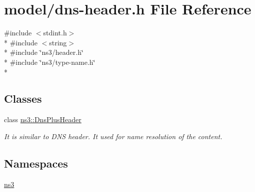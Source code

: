 \hypertarget{dns-header_8h}{\section{model/dns-\/header.h File Reference}
\label{dns-header_8h}
}
{\ttfamily \#include $<$stdint.\-h$>$}\\*
{\ttfamily \#include $<$string$>$}\\*
{\ttfamily \#include \char`\"{}ns3/header.\-h\char`\"{}}\\*
{\ttfamily \#include \char`\"{}ns3/type-\/name.\-h\char`\"{}}\\*
\subsection*{Classes}
\begin{DoxyCompactItemize}
\item 
class \hyperlink{classns3_1_1DnsPlusHeader}{ns3\-::\-Dns\-Plus\-Header}
\begin{DoxyCompactList}\small\item\em It is similar to D\-N\-S header. It used for name resolution of the content. \end{DoxyCompactList}\end{DoxyCompactItemize}
\subsection*{Namespaces}
\begin{DoxyCompactItemize}
\item 
\hyperlink{namespacens3}{ns3}
\end{DoxyCompactItemize}
